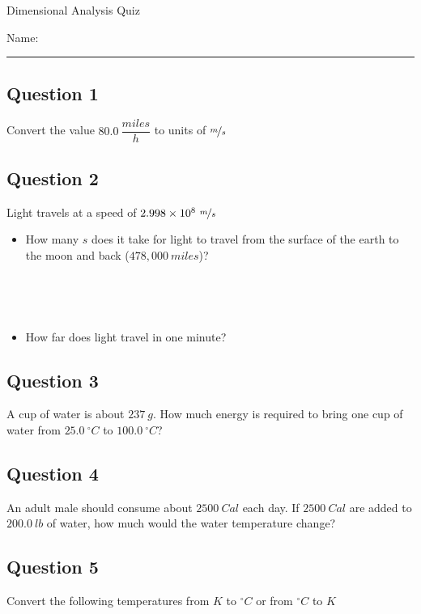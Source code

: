 \documentclass[11pt, letterpaper]{memoir}
\begin{document}
\begin{center}
	{\large	Dimensional Analysis Quiz}
\end{center}
{\large Name: \rule[-1mm]{4in}{.1pt}
\subsection*{Question 1}
Convert the value $80.0~\dfrac{miles}{h}$ to units of $\nicefrac{m}{s}$

\vspace{3em}
\subsection*{Question 2}
Light travels at a speed of $2.998\times10^8~\nicefrac{m}{s}$
\begin{itemize}
	\item How many $s$ does it take for light to travel from the surface of the earth to the moon and back ($478,000~miles$)?

	      ~

	      ~

	\item How far does light travel in one minute?
\end{itemize}

\vspace{1em}
\subsection*{Question 3}
A cup of water is about $237~g$. How much energy is required to bring one cup of water from $25.0~^\circ C$ to $100.0~^\circ C$?

\vspace{3em}
\subsection*{Question 4}
An adult male should consume about $2500~Cal$ each day. If $2500~Cal$ are added to $200.0~lb$ of water, how much would the water temperature change?

\vspace{7em}
\subsection*{Question 5}
Convert the following temperatures from $K$ to $^\circ C$ or from $^\circ C$ to $K$


}
\end{document}
